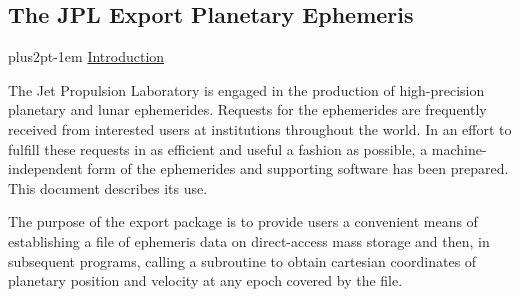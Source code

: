 \documentclass[twoside,11pt]{article}
\renewcommand{\_}{\texttt{\symbol{95}}}
\newcommand{\hdg}[1]{\vskip4pt plus2pt\leavevmode\kern-1em \underline{\large{#1}}\par}
\newcommand{\hdg}[1]{\subsection*{{#1}}}
\begin{document}


\setlength{\parindent}{0pt}
\setlength{\parskip}{8pt}
\setlength{\baselineskip}{11pt}


\begin{center}
\section*{The JPL Export Planetary Ephemeris}
\end{center}

\hdg{Introduction}

The Jet Propulsion Laboratory is engaged in the production of
high-precision planetary and lunar ephemerides. Requests
for the ephemerides are frequently received
from interested users at institutions throughout the world.
In an effort to fulfill these requests in as efficient and
useful a fashion as possible, a machine-independent form of the
ephemerides and supporting software has been prepared.
This document describes its use.

The purpose of the export package is to provide users a convenient
means of establishing a file of ephemeris data on direct-access
mass storage and then, in subsequent programs,
calling a subroutine to obtain cartesian
coordinates of planetary position and velocity at any epoch covered
by the file.
\end{document}

